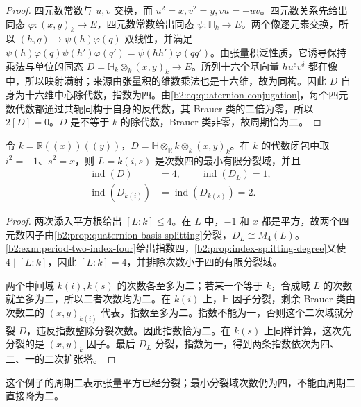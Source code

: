\begin{proof}
	四元数常数与 \(u,v\) 交换，而 \(u^2=x,v^2=y,vu=-uv\)。四元数关系先给出同态 \(\varphi:(x,y)_k\to E\)，四元数常数给出同态 \(\psi:\mathbb H_k\to E\)。两个像逐元素交换，所以 \((h,q)\mapsto\psi(h)\varphi(q)\) 双线性，并满足 \(\psi(h)\varphi(q)\psi(h')\varphi(q')=\psi(hh')\varphi(qq')\)。由张量积泛性质，它诱导保持乘法与单位的同态 \(D=\mathbb H_k\otimes_k(x,y)_k\to E\)。所列十六个基向量 \(hu^\epsilon v^\delta\) 都在像中，所以映射满射；来源由张量积的维数乘法也是十六维，故为同构。因此 \(D\) 自身为十六维中心除代数，指数为四。由\eqref{b2:eq:quaternion-conjugation}，每个四元数代数都通过共轭同构于自身的反代数，其 Brauer 类的二倍为零，所以 \(2[D]=0\)。\(D\) 是不等于 \(k\) 的除代数，Brauer 类非零，故周期恰为二。
\end{proof}


\begin{corollary}\label{b2:cor:period-index-biquadratic-tower}
	令 \(k=\mathbb R(\!(x)\!)(\!(y)\!)\)，\(D=\mathbb H\otimes_{\mathbb R}k\otimes_k(x,y)_k\)。在 \(k\) 的代数闭包中取 \(i^2=-1\)、\(s^2=x\)，则 \(L=k(i,s)\) 是次数四的最小有限分裂域，并且
	\[
		\begin{aligned}
			\operatorname{ind}(D)&=4,\qquad \operatorname{ind}(D_L)=1,\\
			\operatorname{ind}(D_{k(i)})&=\operatorname{ind}(D_{k(s)})=2.
		\end{aligned}
	\]
\end{corollary}
\begin{proof}
	两次添入平方根给出 \([L:k]\le4\)。在 \(L\) 中，\(-1\) 和 \(x\) 都是平方，故两个四元数因子由\cref{b2:prop:quaternion-basis-splitting}分裂，\(D_L\cong M_4(L)\)。\cref{b2:exm:period-two-index-four}给出指数四，\cref{b2:prop:index-splitting-degree}又使 \(4\mid[L:k]\)，因此 \([L:k]=4\)，并排除次数小于四的有限分裂域。

	两个中间域 \(k(i),k(s)\) 的次数各至多为二；若某一个等于 \(k\)，合成域 \(L\) 的次数就至多为二，所以二者次数均为二。在 \(k(i)\) 上，\(\mathbb H\) 因子分裂，剩余 Brauer 类由次数二的 \((x,y)_{k(i)}\) 代表，指数至多为二。指数不能为一，否则这个二次域就分裂 \(D\)，违反指数整除分裂次数。因此指数恰为二。在 \(k(s)\) 上同样计算，这次先分裂的是 \((x,y)_k\) 因子。最后 \(D_L\) 分裂，指数为一，得到两条指数依次为四、二、一的二次扩张塔。
\end{proof}

这个例子的周期二表示张量平方已经分裂；最小分裂域次数仍为四，不能由周期二直接降为二。
